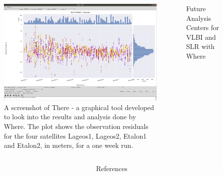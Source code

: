 \documentclass{beamer}
\begin{document}
\begin{frame}[t]
\begin{columns}
\begin{column}[t]{.37\textwidth}
      \begin{figure}
        \includegraphics[width=\textwidth]{figure/there}
        \caption{A screenshot of There - a graphical tool developed
	  to look into the results and analysis done by Where. The plot shows
          the observation residuals for the four satellites Lageos1,
          Lageos2, Etalon1 and Etalon2, in meters, for a one week run.} \label{fig:there}
      \end{figure}
    \end{column}
     
    \begin{column}[t]{0.4\textwidth}
      \begin{block}{Future Analysis Centers for VLBI and SLR with Where}
          
      \end{block}
    \end{column}
  \end{columns}

  \vspace*{3cm}
  
  \begin{columns} 
    \begin{column}[t]{.48\textwidth}
      \begin{table}
        
        \caption{Models and apriori data supported by Where}
        \label{tbl:models}
      \end{table}
    \end{column}

    \begin{column}[t]{.26\textwidth}
      \begin{block}{References}
        
      \end{block}
    \end{column}
  \end{columns}

\end{frame}
\end{document}
